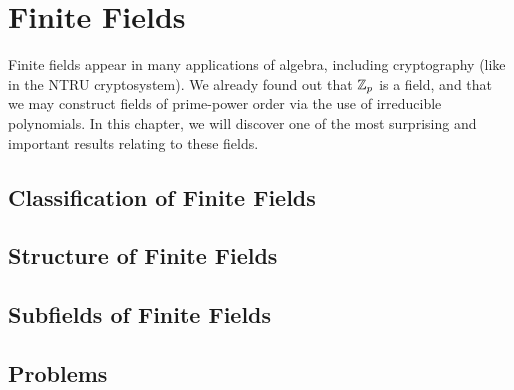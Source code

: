 \chapter{Finite Fields}
Finite fields appear in many applications of algebra, including cryptography (like in the NTRU cryptosystem). We already found out that $\mathbb{Z}_p$ is a field, and that we may construct fields of prime-power order via the use of irreducible polynomials. In this chapter, we will discover one of the most surprising and important results relating to these fields.

\section{Classification of Finite Fields}

\section{Structure of Finite Fields}

\section{Subfields of Finite Fields}

\newpage
\section{Problems}
